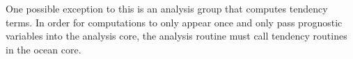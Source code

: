 \documentclass[11pt]{report}
\begin{document}
One possible exception to this is an analysis group that computes tendency terms.  In order for computations to only appear once and only pass prognostic variables into the analysis core, the analysis routine must call tendency routines in the ocean core.







\end{document}
